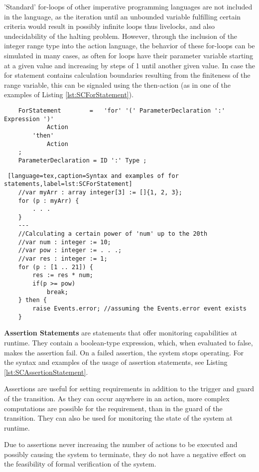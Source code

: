 'Standard' for-loops of other imperative programming languages are not included in the language, as the iteration until an unbounded variable fulfilling certain criteria would result in possibly infinite loops thus livelocks, and also undecidability of the halting problem. However, through the inclusion of the integer range type into the action language, the behavior of these for-loops can be simulated in many cases, as often for loops have their parameter variable starting at a given value and increasing by steps of 1 until another given value. In case the for statement contains calculation boundaries resulting from the finiteness of the range variable, this can be signaled using the then-action (as in one of the examples of Listing \ref{lst:SCForStatement}).

\bigskip
\begin{lstlisting}
	ForStatement 		= 	'for' '(' ParameterDeclaration ':' Expression ')'
			Action
		'then'
			Action
	;
	ParameterDeclaration = ID ':' Type ;	
\end{lstlisting}
\begin{lstlisting} [language=tex,caption=Syntax and examples of for statements,label=lst:SCForStatement]
	//var myArr : array integer[3] := []{1, 2, 3};
	for (p : myArr) {
		. . .
	}
	---
	//Calculating a certain power of 'num' up to the 20th
	//var num : integer := 10;
	//var pow : integer := . . .;
	//var res : integer := 1;
	for (p : [1 .. 21]) {
		res := res * num;
		if(p >= pow)
			break;
	} then {
		raise Events.error;	//assuming the Events.error event exists
	}
\end{lstlisting} 

\bigskip
\textbf{Assertion Statements} are statements that offer monitoring capabilities at runtime. They contain a boolean-type expression, which, when evaluated to false, makes the assertion fail. On a failed assertion, the system stops operating. For the syntax and examples of the usage of assertion statements, see Listing \ref{lst:SCAssertionStatement}.

Assertions are useful for setting requirements in addition to the trigger and guard of the transition. As they can occur anywhere in an action, more complex computations are possible for the requirement, than in the guard of the transition. They can also be used for monitoring the state of the system at runtime.

Due to assertions never increasing the number of actions to be executed and possibly causing the system to terminate, they do not have a negative effect on the feasibility of formal verification of the system. 

